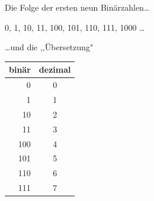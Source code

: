 \begin{frame}{Die Folge der ersten neun Binärzahlen\ldots{}}
  \begin{center}
    0, 1, 10, 11, 100, 101, 110, 111, 1000 \ldots{}
  \end{center}
\end{frame}
%
\begin{frame}{\ldots{}und die ,,Übersetzung"}
  \begin{center}
    \begin{tabular}{|r|c|}
      \hline 
      binär & dezimal\tabularnewline
      \hline 
      \hline 
      0 & 0\tabularnewline
      \hline 
      1 & 1\tabularnewline
      \hline 
      10 & 2\tabularnewline
      \hline 
      11 & 3\tabularnewline
      \hline 
      100 & 4\tabularnewline
      \hline 
      101 & 5\tabularnewline
      \hline 
      110 & 6\tabularnewline
      \hline 
      111 & 7\tabularnewline
      \hline 
    \end{tabular}
  \end{center}
\end{frame}

